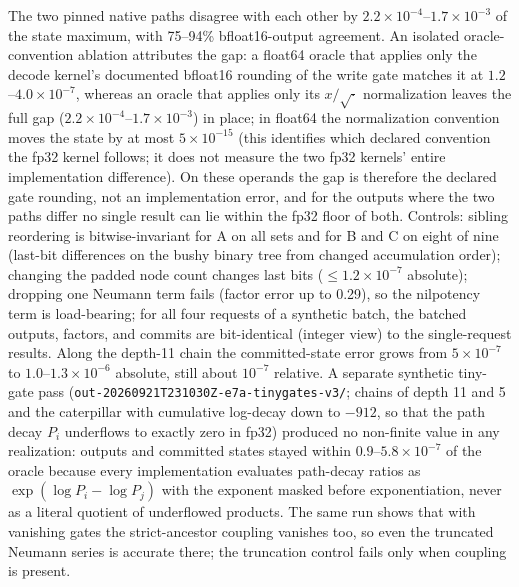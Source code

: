 \documentclass[conference]{IEEEtran}
\begin{document}
The two pinned native paths disagree with each other by $2.2\times10^{-4}$--$1.7\times10^{-3}$ of the state maximum, with 75--94\% bfloat16-output agreement. An isolated oracle-convention ablation attributes the gap: a float64 oracle that applies only the decode kernel's documented bfloat16 rounding of the write gate matches it at $1.2$--$4.0\times10^{-7}$, whereas an oracle that applies only its $x/\sqrt{\cdot}$ normalization leaves the full gap ($2.2\times10^{-4}$--$1.7\times10^{-3}$) in place; in float64 the normalization convention moves the state by at most $5\times10^{-15}$ (this identifies which declared convention the fp32 kernel follows; it does not measure the two fp32 kernels' entire implementation difference). On these operands the gap is therefore the declared gate rounding, not an implementation error, and for the outputs where the two paths differ no single result can lie within the fp32 floor of both. Controls: sibling reordering is bitwise-invariant for A on all sets and for B and C on eight of nine (last-bit differences on the bushy binary tree from changed accumulation order); changing the padded node count changes last bits ($\le1.2\times10^{-7}$ absolute); dropping one Neumann term fails (factor error up to 0.29), so the nilpotency term is load-bearing; for all four requests of a synthetic batch, the batched outputs, factors, and commits are bit-identical (integer view) to the single-request results. Along the depth-11 chain the committed-state error grows from $5\times10^{-7}$ to $1.0$--$1.3\times10^{-6}$ absolute, still about $10^{-7}$ relative. A separate synthetic tiny-gate pass (\texttt{out-20260921T231030Z-e7a-tinygates-v3/}; chains of depth 11 and 5 and the caterpillar with cumulative log-decay down to $-912$, so that the path decay $P_i$ underflows to exactly zero in fp32) produced no non-finite value in any realization: outputs and committed states stayed within $0.9$--$5.8\times10^{-7}$ of the oracle because every implementation evaluates path-decay ratios as $\exp(\log P_i-\log P_j)$ with the exponent masked before exponentiation, never as a literal quotient of underflowed products. The same run shows that with vanishing gates the strict-ancestor coupling vanishes too, so even the truncated Neumann series is accurate there; the truncation control fails only when coupling is present.
\end{document}
